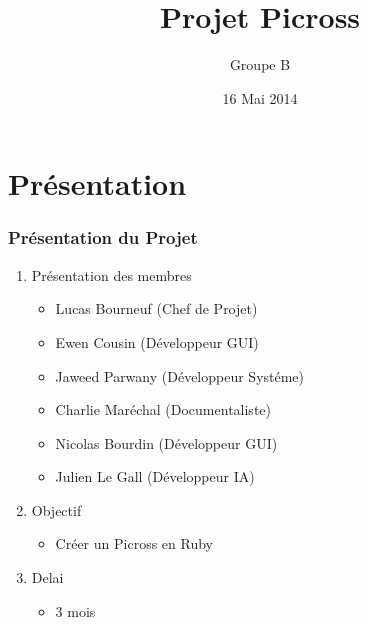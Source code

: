 \documentclass[12pt]{beamer}
\title {Projet Picross}
\author{Groupe B}
\date{16 Mai 2014}
\institute{Université du Maine}
\begin{document}
\maketitle
\begin{frame}{}
  \tableofcontents
\end{frame}
   
\section{Présentation}
\begin{frame}
\frametitle{Présentation du Projet}
    \begin{enumerate}
     
      \item Présentation des membres
        \begin{itemize}
            \item Lucas Bourneuf   (Chef de Projet)
            \item Ewen Cousin      (Développeur GUI)
            \item Jaweed Parwany   (Développeur Systéme)
            \item Charlie Maréchal (Documentaliste)
            \item Nicolas Bourdin  (Développeur GUI)
            \item Julien Le Gall   (Développeur IA)
        \end{itemize}
     
      \item Objectif
        \begin{itemize}
            \item Créer un Picross en Ruby
        \end{itemize}
     
      \item Delai
        \begin{itemize}
            \item 3 mois
        \end{itemize}
 \end{enumerate}   
 \end{frame}
    
\end{document}
